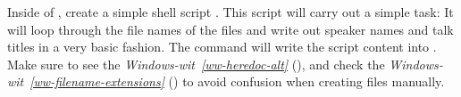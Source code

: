 \sphinxAtStartPar
Inside of , create a simple shell script .
This script will carry out a simple task:
It will loop through the file names of the  files and
write out speaker names and talk titles in a very basic fashion.
The  command will write the script content into .
Make sure to see the \textit{Windows-wit}~{\windowswiticoninline}\textit{\ref{ww-heredoc-alt}} {\hyperref[\detokenize{basics/101-108-run:ww-heredoc-alt}]{}} (), and check
the \textit{Windows-wit}~{\windowswiticoninline}\textit{\ref{ww-filename-extensions}} {\hyperref[\detokenize{basics/101-108-run:ww-filename-extensions}]{}} ()
to avoid confusion when creating files manually.
